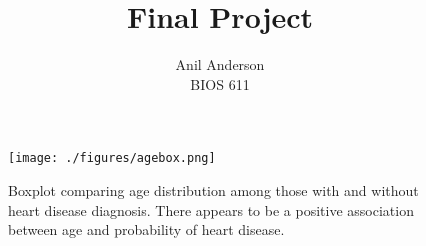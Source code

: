 \documentclass[12pt]{article}
\begin{document}
 
\title{Final Project}
\author{Anil Anderson\\
BIOS 611}
 
\maketitle

\begin{figure}[htbp]
\centering
\texttt{[image: ./figures/agebox.png]}
\caption{Boxplot comparing age distribution among those with and without heart disease diagnosis. There appears to be a positive association between age and probability of heart disease.}
\end{figure}
\end{document}
